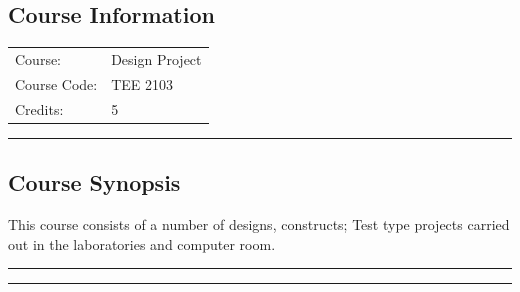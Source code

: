 
\subsection*{Course Information}
\vspace{0ex}%
\noindent\parbox{0.5\textwidth}{%
    \noindent\begin{tabular}{@{}ll}
                 \textsf{Course:}          & 	Design Project \\
                 \textsf{Course Code:}         & 	TEE 2103 \\
                 \textsf{Credits:}    & 	5
    \end{tabular}}
\vspace{2ex}\hrule\vspace{2ex}


\subsection*{Course Synopsis}
This course consists of a number of designs, constructs; Test type projects carried out in the laboratories and computer room.
\vspace{2ex}\hrule
\vspace{2ex}\hrule\vspace{2ex}